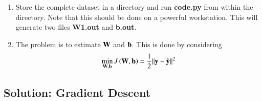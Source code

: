\documentclass[journal,12pt,twocolumn]{IEEEtran}
\renewcommand\thesection{\arabic{section}}
\begin{document}
\begin{enumerate}[label=\thesection.\arabic*
,ref=\thesection.\theenumi]
\item Store the complete dataset in a directory and run \textbf{code.py} from  within the 
directory.  Note that this should be done on a powerful workstation. This will generate two files
\textbf{W1.out} and \textbf{b.out}.

\item The problem is to estimate $\mathbf{W}$ and $\mathbf{b}$.  This is done by considering 
\begin{equation}
\label{eq:cost}
\min_{\mathbf{W},\mathbf{b}} J\left(\mathbf{W},\mathbf{b}\right)  = \frac{1}{2}\lVert\mathbf{y}-\hat{\mathbf{y}}\rVert^2
\end{equation}
\end{enumerate}
\subsection{Solution: Gradient Descent}
\end{document}

